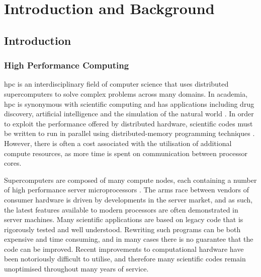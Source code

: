 \documentclass[a4paper,11pt]{report}
\begin{document}
%
%






\tableofcontents{}
\listoffigures
\listoftables
\printglossary[type=\acronymtype,title=List of Abbreviations]

\cleardoublepage%









\part{Introduction and Background}
\chapter{Introduction}
\label{chap:intro}
\section{High Performance Computing}
\label{sec:sec01}
\gls{hpc} is an interdisciplinary field of computer science that uses distributed supercomputers to solve complex problems across many domains. In academia, \gls{hpc} is synonymous with scientific computing and has applications including drug discovery, artificial intelligence and the simulation of the natural world \cite{okimoto2009high, jouppi2017datacenter, bretherton2012national}. In order to exploit the performance offered by distributed hardware, scientific codes must be written to run in parallel using distributed-memory programming techniques \cite{asanovic2006landscape}. However, there is often a cost associated with the utilisation of additional compute resources, as more time is spent on communication between processor cores. 
\par
Supercomputers are composed of many compute nodes, each containing a number of high performance server microprocessors \cite{becker1995beowulf, beowulf14reed}. The arms race between vendors of consumer hardware is driven by developments in the server market, and as such, the latest features available to modern processors are often demonstrated in server machines. Many scientific applications are based on legacy code that is rigorously tested and well understood. Rewriting such programs can be both expensive and time consuming, and in many cases there is no guarantee that the code can be improved. Recent improvements to computational hardware have been notoriously difficult to utilise, and therefore many scientific codes remain unoptimised throughout many years of service.
\end{document}

